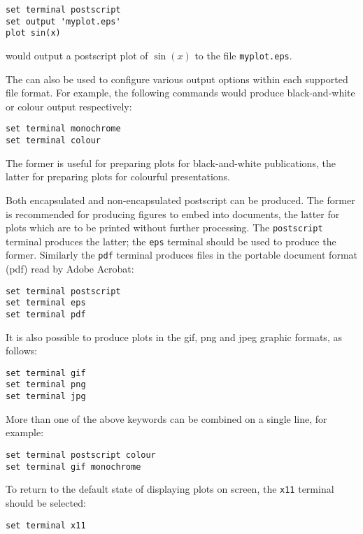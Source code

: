 \begin{verbatim}
set terminal postscript
set output 'myplot.eps'
plot sin(x)
\end{verbatim}

\noindent would output a postscript plot of $\sin(x)$ to the file
{\tt myplot.eps}.

The  can also be used to configure various output options
within each supported file format.  For example, the following commands would
produce black-and-white or colour output respectively:

\begin{verbatim}
set terminal monochrome
set terminal colour
\end{verbatim}

\noindent The former is useful for preparing plots for black-and-white
publications, the latter for preparing plots for colourful presentations.

Both encapsulated and non-encapsulated postscript can be produced. The former
is recommended for producing figures to embed into documents, the latter for
plots which are to be printed without further processing. The
{\tt postscript} terminal produces the latter; the {\tt eps} terminal
should be used to produce the former.  Similarly the {\tt pdf} terminal
produces files in the portable document format (pdf) read by
Adobe Acrobat:

\begin{verbatim}
set terminal postscript
set terminal eps
set terminal pdf
\end{verbatim}

It is also possible to produce plots in the gif, png and jpeg graphic formats,
as follows:

\begin{verbatim}
set terminal gif
set terminal png
set terminal jpg
\end{verbatim}

More than one of the above keywords can be combined on a single line, for
example:

\begin{verbatim}
set terminal postscript colour
set terminal gif monochrome
\end{verbatim}

To return to the default state of displaying plots on screen, the {\tt x11}
terminal should be selected:

\begin{verbatim}
set terminal x11
\end{verbatim}

